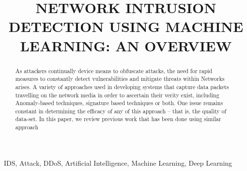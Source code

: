 \documentclass[conference]{IEEEtran}
\begin{document}
\title{NETWORK INTRUSION DETECTION USING MACHINE LEARNING: AN OVERVIEW}

\author{
}

\maketitle

\begin{abstract}
As attackers continually device means to obfuscate attacks, the need for rapid measures to constantly detect vulnerabilities and mitigate threats within Networks arises. A variety of approaches used in developing systems that capture data packets travelling on the network media in order to ascertain their verity exist, including Anomaly-based techniques, signature based techniques or both. One issue remains constant in determining the efficacy of any of this approach – that is, the quality of data-set. In this paper, we review previous work that has been done using similar approach
\end{abstract}

\begin{IEEEkeywords}
IDS, Attack, DDoS, Artificial Intelligence, Machine Learning, Deep Learning
\end{IEEEkeywords}
\end{document}
